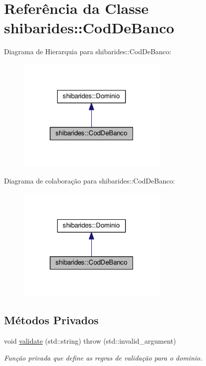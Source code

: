 \hypertarget{classshibarides_1_1CodDeBanco}{}\section{Referência da Classe shibarides\+:\+:Cod\+De\+Banco}
\label{classshibarides_1_1CodDeBanco}


Diagrama de Hierarquia para shibarides\+:\+:Cod\+De\+Banco\+:\nopagebreak
\begin{figure}[H]
\begin{center}
\leavevmode
\includegraphics[width=205pt]{classshibarides_1_1CodDeBanco__inherit__graph}
\end{center}
\end{figure}


Diagrama de colaboração para shibarides\+:\+:Cod\+De\+Banco\+:\nopagebreak
\begin{figure}[H]
\begin{center}
\leavevmode
\includegraphics[width=205pt]{classshibarides_1_1CodDeBanco__coll__graph}
\end{center}
\end{figure}
\subsection*{Métodos Privados}
\begin{DoxyCompactItemize}
\item 
void \hyperlink{classshibarides_1_1CodDeBanco_a111bd50227f559d36010ddbf7bee1107}{validate} (std\+::string)  throw (std\+::invalid\+\_\+argument)
\begin{DoxyCompactList}\small\item\em Função privada que define as regras de validação para o dominio. \end{DoxyCompactList}\end{DoxyCompactItemize}

